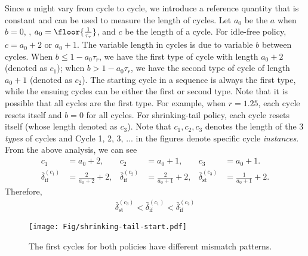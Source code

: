 Since $a$ might vary from cycle to cycle, we introduce a reference quantity that is constant and can be used to measure the length of cycles.
Let $a_0$ be the $a$ when $b = 0$, \ie, $a_0 = \floor{\frac{1}{\tau_r}}$, and $c$ be the length of a cycle. For idle-free policy, $c = a_0 + 2$ or $a_0 + 1$. The variable length in cycles is due to variable $b$ between cycles. When $b \leq 1 - a_0 \tau_r$, we have the first type of cycle with length $a_0 + 2$ (denoted as $c_1$); when $b > 1 - a_0 \tau_r$, we have the second type of cycle of length $a_0 + 1$ (denoted as $c_2$). The starting cycle in a sequence is always the first type, while the ensuing cycles can be either the first or second type. Note that it is possible that all cycles are the first type. For example, when $r = 1.25$, each cycle resets itself and $b = 0$ for all cycles. For shrinking-tail policy, each cycle resets itself (whose length denoted as $c_3$). Note that $c_1, c_2, c_3$ denotes the length of the 3 {\em types} of cycles and Cycle 1, 2, 3, ... in the figures denote specific cycle {\em instances}.
From the above analysis, we can see
\begin{align}
c_1  &= a_0 + 2, & c_2 & = a_0 + 1, & c_3 &= a_0 + 1. \label{eq:c} \\
\bar{\delta}^{(c_1)}_{\text{if}}  &= \frac{2}{a_0 + 2} + 2, & \bar{\delta}^{(c_2)}_{\text{if}}  &= \frac{2}{a_0 + 1} + 2, & \bar{\delta}^{(c_3)}_{\text{st}}  &= \frac{1}{a_0 + 1} + 2. \label{eq:deltac}
\end{align}
Therefore,
\begin{align}
    \bar{\delta}^{(c_3)}_{\text{st}} < \bar{\delta}^{(c_1)}_{\text{if}} < \bar{\delta}^{(c_2)}_{\text{if}}
    \label{eq:deltac_compare}
\end{align}

\begin{figure}[!b]
\centering
\texttt{[image: Fig/shrinking-tail-start.pdf]}

\caption{The first cycles for both policies have different mismatch patterns.
}
\label{fig:schedule-starting}
\end{figure}

